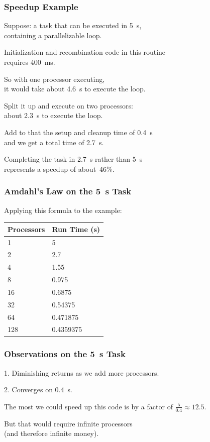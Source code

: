 \begin{frame}
\frametitle{Speedup Example}


Suppose: a task that can be executed in 5~s, \\
containing a parallelizable loop.

Initialization and recombination code in this routine \\
requires 400~ms. 

So with one processor executing, \\
\qquad it would take about 4.6~s to execute the loop. 

Split it up and execute on two processors: \\
\qquad about 2.3~s to execute the loop. 

Add to that the setup and cleanup time of 0.4~s \\
\qquad and we get a total time of 2.7~s. 

Completing the task in 2.7~s rather than 5~s \\
\qquad represents a speedup of about~46\%.

\end{frame}


\begin{frame}
\frametitle{Amdahl's Law on the 5~s Task}

Applying this formula to the example:

\begin{center}
	\begin{tabular}{l|l}
	\textbf{Processors} & \textbf{Run Time (s)} \\ \hline
	1 & 5\\
	2 & 2.7\\
	4 & 1.55\\
	8 & 0.975\\
	16 & 0.6875 \\
	32 & 0.54375 \\
	64 & 0.471875 \\
	128 & 0.4359375\\
	\end{tabular}
\end{center}

\end{frame}

 
\begin{frame}
\frametitle{Observations on the 5~s Task}

1. Diminishing returns as we add more processors.

2. Converges on 0.4~s.

The most we could speed up this code is by a factor of $\frac{5}{0.4}\approx 12.5$.

But that would require infinite processors \\
\qquad (and therefore infinite money).

\end{frame}

